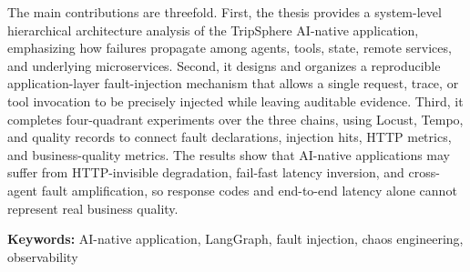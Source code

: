 The main contributions are threefold. First, the thesis provides a system-level hierarchical architecture analysis of the TripSphere AI-native application, emphasizing how failures propagate among agents, tools, state, remote services, and underlying microservices. Second, it designs and organizes a reproducible application-layer fault-injection mechanism that allows a single request, trace, or tool invocation to be precisely injected while leaving auditable evidence. Third, it completes four-quadrant experiments over the three chains, using Locust, Tempo, and quality records to connect fault declarations, injection hits, HTTP metrics, and business-quality metrics. The results show that AI-native applications may suffer from HTTP-invisible degradation, fail-fast latency inversion, and cross-agent fault amplification, so response codes and end-to-end latency alone cannot represent real business quality.

\noindent\textbf{Keywords:} AI-native application, LangGraph, fault injection, chaos engineering, observability
